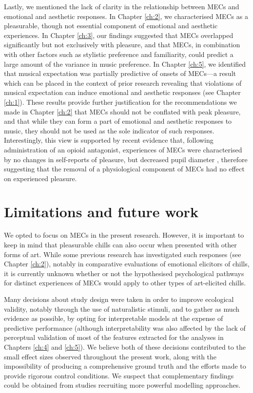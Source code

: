 Lastly, we mentioned the lack of clarity in the relationship between MECs and emotional and aesthetic responses. In Chapter \ref{ch:2}, we characterised MECs as a pleasurable, though not essential component of emotional and aesthetic experiences. In Chapter \ref{ch:3}, our findings suggested that MECs overlapped significantly but not exclusively with pleasure, and that MECs, in combination with other factors such as stylistic preference and familiarity, could predict a large amount of the variance in music preference. In Chapter \ref{ch:5}, we identified that musical expectation was partially predictive of onsets of MECs---a result which can be placed in the context of prior research revealing that violations of musical expectation can induce emotional and aesthetic responses (see Chapter \ref{ch:1}). These results provide further justification for the recommendations we made in Chapter \ref{ch:2} that MECs should not be conflated with peak pleasure, and that while they can form a part of emotional and aesthetic responses to music, they should not be used as the sole indicator of such responses. Interestingly, this view is supported by recent evidence that, following administration of an opioid antagonist, experiences of MECs were characterised by no changes in self-reports of pleasure, but decreased pupil diameter \parencite{laeng2021}, therefore suggesting that the removal of a physiological component of MECs had no effect on experienced pleasure.

\section{Limitations and future work}

We opted to focus on MECs in the present research. However, it is important to keep in mind that pleasurable chills can also occur when presented with other forms of art. While some previous research has investigated such responses (see Chapter \ref{ch:2}), notably in comparative evaluations of emotional elicitors of chills, it is currently unknown whether or not the hypothesised psychological pathways for distinct experiences of MECs would apply to other types of art-elicited chills.

Many decisions about study design were taken in order to improve ecological validity, notably through the use of naturalistic stimuli, and to gather as much evidence as possible, by opting for interpretable models at the expense of predictive performance (although interpretability was also affected by the lack of perceptual validation of most of the features extracted for the analyses in Chapters \ref{ch:4} and \ref{ch:5}). We believe both of these decisions contributed to the small effect sizes observed throughout the present work, along with the impossibility of producing a comprehensive ground truth and the efforts made to provide rigorous control conditions. We suspect that complementary findings could be obtained from studies recruiting more powerful modelling approaches.

